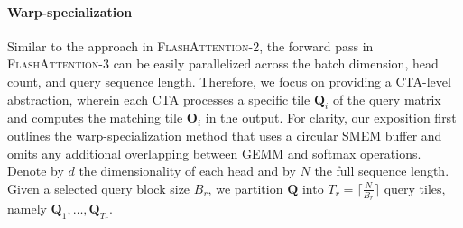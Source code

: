 \begin{enumerate}
\paragraph{Warp-specialization}
Similar to the approach in \textsc{FlashAttention-2}, the forward pass in \textsc{FlashAttention-3} can be easily parallelized across the batch dimension, head count, and query sequence length. Therefore, we focus on providing a CTA-level abstraction, wherein each CTA processes a specific tile $\mathbf{Q}_i$ of the query matrix and computes the matching tile $\mathbf{O}_i$ in the output. For clarity, our exposition first outlines the warp-specialization method that uses a circular SMEM buffer and omits any additional overlapping between GEMM and softmax operations. Denote by $d$ the dimensionality of each head and by $N$ the full sequence length. Given a selected query block size $B_r$, we partition $\mathbf{Q}$ into $T_r = \lceil \frac{N}{B_r} \rceil$ query tiles, namely $\mathbf{Q}_1, \ldots, \mathbf{Q}_{T_r}$.


\end{enumerate}
